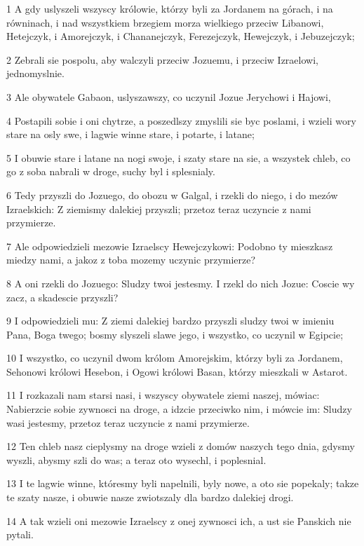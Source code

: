 \par 1 A gdy uslyszeli wszyscy królowie, którzy byli za Jordanem na górach, i na równinach, i nad wszystkiem brzegiem morza wielkiego przeciw Libanowi, Hetejczyk, i Amorejczyk, i Chananejczyk, Ferezejczyk, Hewejczyk, i Jebuzejczyk;
\par 2 Zebrali sie pospolu, aby walczyli przeciw Jozuemu, i przeciw Izraelowi, jednomyslnie.
\par 3 Ale obywatele Gabaon, uslyszawszy, co uczynil Jozue Jerychowi i Hajowi,
\par 4 Postapili sobie i oni chytrze, a poszedlszy zmyslili sie byc poslami, i wzieli wory stare na osly swe, i lagwie winne stare, i potarte, i latane;
\par 5 I obuwie stare i latane na nogi swoje, i szaty stare na sie, a wszystek chleb, co go z soba nabrali w droge, suchy byl i splesnialy.
\par 6 Tedy przyszli do Jozuego, do obozu w Galgal, i rzekli do niego, i do mezów Izraelskich: Z ziemismy dalekiej przyszli; przetoz teraz uczyncie z nami przymierze.
\par 7 Ale odpowiedzieli mezowie Izraelscy Hewejczykowi: Podobno ty mieszkasz miedzy nami, a jakoz z toba mozemy uczynic przymierze?
\par 8 A oni rzekli do Jozuego: Sludzy twoi jestesmy. I rzekl do nich Jozue: Coscie wy zacz, a skadescie przyszli?
\par 9 I odpowiedzieli mu: Z ziemi dalekiej bardzo przyszli sludzy twoi w imieniu Pana, Boga twego; bosmy slyszeli slawe jego, i wszystko, co uczynil w Egipcie;
\par 10 I wszystko, co uczynil dwom królom Amorejskim, którzy byli za Jordanem, Sehonowi królowi Hesebon, i Ogowi królowi Basan, którzy mieszkali w Astarot.
\par 11 I rozkazali nam starsi nasi, i wszyscy obywatele ziemi naszej, mówiac: Nabierzcie sobie zywnosci na droge, a idzcie przeciwko nim, i mówcie im: Sludzy wasi jestesmy, przetoz teraz uczyncie z nami przymierze.
\par 12 Ten chleb nasz cieplysmy na droge wzieli z domów naszych tego dnia, gdysmy wyszli, abysmy szli do was; a teraz oto wysechl, i poplesnial.
\par 13 I te lagwie winne, któresmy byli napelnili, byly nowe, a oto sie popekaly; takze te szaty nasze, i obuwie nasze zwiotszaly dla bardzo dalekiej drogi.
\par 14 A tak wzieli oni mezowie Izraelscy z onej zywnosci ich, a ust sie Panskich nie pytali.
